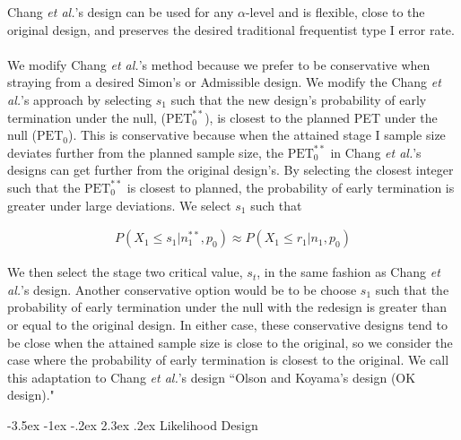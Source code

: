 \documentclass[12pt]{report}\usepackage[]{graphicx}\usepackage[]{color}
\makeatletter
\newlength{\li}\setlength{\li}{14.48pt}
\newlength{\di}\setlength{\di}{-3.5mm}
\renewcommand\section{ \@startsection {section}{1}{\z@}%
                                   {-3.5ex \@plus -1ex \@minus -.2ex}%
                                   {2.3ex \@plus.2ex}%
                                   {\centering\large\fontfamily{qcs}\selectfont}}
\makeatother
\begin{document}
Chang \textit{et al.}'s design can be used for any $\alpha$-level and is flexible, close to the original design, and preserves the desired traditional frequentist type I error rate. \\
\\
\indent We modify Chang \textit{et al.}'s method because we prefer to be conservative when straying from a desired Simon's or Admissible design. We modify the Chang \textit{et al.}'s approach by selecting $s_1$ such that the new design's probability of early termination under the null, ($\mbox{PET}_0^{\ast\ast}$), is closest to the planned PET under the null ($\mbox{PET}_0$). This is conservative because when the attained stage I sample size deviates further from the planned sample size, the $\mbox{PET}_0^{\ast\ast}$ in Chang \textit{et al.}'s designs can get further from the original design's. By selecting the closest integer such that the $\mbox{PET}_0^{\ast\ast}$ is closest to planned, the probability of early termination is greater under large deviations. We select $s_1$ such that 

\begin{equation}
\begin{aligned}
P(X_1 \leq s_1 | n_1^{\ast\ast}, p_0) \approx P(X_1 \leq r_1 | n_1, p_0)
\end{aligned}
\end{equation}

We then select the stage two critical value, $s_t$, in the same fashion as Chang \textit{et al.}'s design. Another conservative option would be to be choose $s_1$ such that the probability of early termination under the null with the redesign is greater than or equal to the original design. In either case, these conservative designs tend to be close when the attained sample size is close to the original, so we consider the case where the probability of early termination is closest to the original. We call this adaptation to Chang \textit{et al.}'s design ``Olson and Koyama's design (OK design)." 

\section{Likelihood Design}
\end{document}
